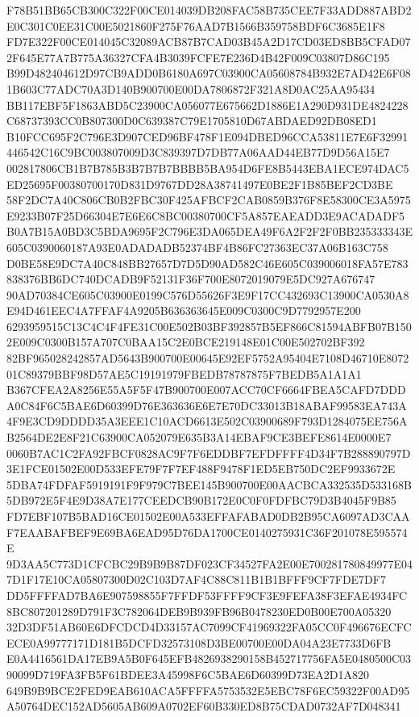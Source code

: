 \documentclass[UTF8,fontset=fandol,zihao=-4,a4paper]{ctexart}
\begin{document}
{{F78B51BB65CB300C322F00CE014039DB208FAC58B735CEE7F33ADD887ABD2E0C301C0EE31C00E5021860F275F76AAD7B1566B359758BDF6C3685E1F8
FD7E322F00CE014045C32089ACB87B7CAD03B45A2D17CD03ED8BB5CFAD072F645E77A7B775A36327CFA4B3039FCFE7E236D4B42F009C03807D86C195
B99D482404612D97CB9ADD0B6180A697C03900CA05608784B932E7AD42E6F081B603C77ADC70A3D140B900700E00DA7806872F321A8D0AC25AA95434
BB117EBF5F1863ABD5C23900CA056077E675662D1886E1A290D931DE4824228C68737393CC0B807300D0C639387C79E1705810D67ABDAED92DB08ED1
B10FCC695F2C796E3D907CED96BF478F1E094DBED96CCA53811E7E6F32991446542C16C9BC003807009D3C839397D7DB77A06AAD44EB77D9D56A15E7
002817806CB1B7B785B3B7B7B7BBBB5BA954D6FE8B5443EBA1ECE974DAC5ED25695F00380700170D831D9767DD28A38741497E0BE2F1B85BEF2CD3BE
58F2DC7A40C806CB0B2FBC30F425AFBCF2CAB0859B376F8E58300CE3A5975E9233B07F25D66304E7E6E6C8BC00380700CF5A857EAEADD3E9ACADADF5
B0A7B15A0BD3C5BDA9695F2C796E3DA065DEA49F6A2F2F2F0BB235333343E605C0390060187A93E0ADADADB52374BF4B86FC27363EC37A06B163C758
D0BE58E9DC7A40C848BB27657D7D5D90AD582C46E605C039006018FA57E783838376BB6DC740DCADB9F52131F36F700E8072019079E5DC927A676747
90AD70384CE605C03900E0199C576D55626F3E9F17CC432693C13900CA0530A8E94D461EEC4A7FFAF4A9205B636363645E009C0300C9D7792957E200
6293959515C13C4C4F4FE31C00E502B03BF392857B5EF866C81594ABFB07B1502E009C0300B157A707C0BAA15C2E0BCE219148E01C00E502702BF392
82BF965028242857AD5643B900700E00645E92EF5752A95404E7108D46710E807201C89379BBF98D57AE5C19191979FBEDB78787875F7BEDB5A1A1A1
B367CFEA2A8256E55A5F5F47B900700E007ACC70CF6664FBEA5CAFD7DDDA0C84F6C5BAE6D60399D76E363636E6E7E70DC33013B18ABAF99583EA743A
4F9E3CD9DDDD35A3EEE1C10ACD6613E502C03900689F793D1284075EE756AB2564DE2E8F21C63900CA052079E635B3A14EBAF9CE3BEFE8614E0000E7
0060B7AC1C2FA92FBCF0828AC9F7F6EDDBF7EFDFFFF4D34F7B288890797D3E1FCE01502E00D533EFE79F7F7EF488F9478F1ED5EB750DC2EF9933672E
5DBA74FDFAF5919191F9F979C7BEE145B900700E00AACBCA332535D533168B5DB972E5F4E9D38A7E177CEEDCB90B172E0C0F0FDFBC79D3B4045F9B85
FD7EBF107B5BAD16CE01502E00A533EFFAFABAD0DB2B95CA6097AD3CAAF7EAABAFBEF9E69BA6EAD95D76DA1700CE0140275931C36F201078E595574E
9D3AA5C773D1CFCBC29B9B9B87DF023CF34527FA2E00E700281780849977E047D1F17E10CA05807300D02C103D7AF4C88C811B1B1BFFF9CF7FDE7DF7
DD5FFFFAD7BA6E907598855F7FFDF53FFFF9CF3E9FEFA38F3EFAE4934FC8BC807201289D791F3C782064DEB9B939FB96B0478230ED0B00E700A05320
32D3DF51AB60E6DFCDCD4D33157AC7099CF41969322FA05CC0F496676ECFCECE0A99777171D181B5DCFD32573108D3BE00700E00DA04A23E7733D6FB
E0A4416561DA17EB9A5B0F645EFB4826938290158B452717756FA5E0480500C0390099D719FA3FB5F61BDEE3A45998F6C5BAE6D60399D73EA2D1A820
649B9B9BCE2FED9EAB610ACA5FFFFA5753532E5EBC78F6EC59322F00AD95A50764DEC152AD5605AB609A0702EF60B330ED8B75CDAD0732AF7D048341
}}
\end{document}
